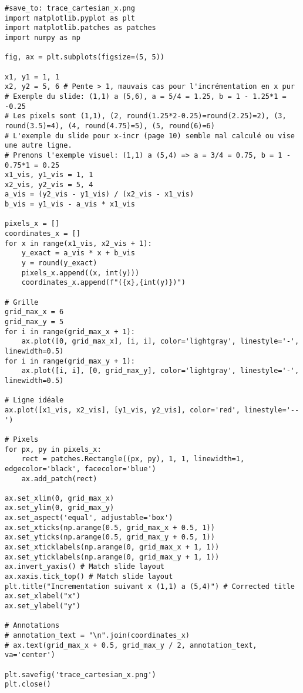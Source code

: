 \documentclass{article}
\begin{document}
\begin{verbatim}
#save_to: trace_cartesian_x.png
import matplotlib.pyplot as plt
import matplotlib.patches as patches
import numpy as np

fig, ax = plt.subplots(figsize=(5, 5))

x1, y1 = 1, 1
x2, y2 = 5, 6 # Pente > 1, mauvais cas pour l'incrémentation en x pur
# Exemple du slide: (1,1) a (5,6), a = 5/4 = 1.25, b = 1 - 1.25*1 = -0.25
# Les pixels sont (1,1), (2, round(1.25*2-0.25)=round(2.25)=2), (3, round(3.5)=4), (4, round(4.75)=5), (5, round(6)=6)
# L'exemple du slide pour x-incr (page 10) semble mal calculé ou vise une autre ligne.
# Prenons l'exemple visuel: (1,1) a (5,4) => a = 3/4 = 0.75, b = 1 - 0.75*1 = 0.25
x1_vis, y1_vis = 1, 1
x2_vis, y2_vis = 5, 4
a_vis = (y2_vis - y1_vis) / (x2_vis - x1_vis)
b_vis = y1_vis - a_vis * x1_vis

pixels_x = []
coordinates_x = []
for x in range(x1_vis, x2_vis + 1):
    y_exact = a_vis * x + b_vis
    y = round(y_exact)
    pixels_x.append((x, int(y)))
    coordinates_x.append(f"({x},{int(y)})")

# Grille
grid_max_x = 6
grid_max_y = 5
for i in range(grid_max_x + 1):
    ax.plot([0, grid_max_x], [i, i], color='lightgray', linestyle='-', linewidth=0.5)
for i in range(grid_max_y + 1):
    ax.plot([i, i], [0, grid_max_y], color='lightgray', linestyle='-', linewidth=0.5)

# Ligne idéale
ax.plot([x1_vis, x2_vis], [y1_vis, y2_vis], color='red', linestyle='--')

# Pixels
for px, py in pixels_x:
    rect = patches.Rectangle((px, py), 1, 1, linewidth=1, edgecolor='black', facecolor='blue')
    ax.add_patch(rect)

ax.set_xlim(0, grid_max_x)
ax.set_ylim(0, grid_max_y)
ax.set_aspect('equal', adjustable='box')
ax.set_xticks(np.arange(0.5, grid_max_x + 0.5, 1))
ax.set_yticks(np.arange(0.5, grid_max_y + 0.5, 1))
ax.set_xticklabels(np.arange(0, grid_max_x + 1, 1))
ax.set_yticklabels(np.arange(0, grid_max_y + 1, 1))
ax.invert_yaxis() # Match slide layout
ax.xaxis.tick_top() # Match slide layout
plt.title("Incrementation suivant x (1,1) a (5,4)") # Corrected title
ax.set_xlabel("x")
ax.set_ylabel("y")

# Annotations
# annotation_text = "\n".join(coordinates_x)
# ax.text(grid_max_x + 0.5, grid_max_y / 2, annotation_text, va='center')

plt.savefig('trace_cartesian_x.png')
plt.close()
\end{verbatim}
\end{document}
